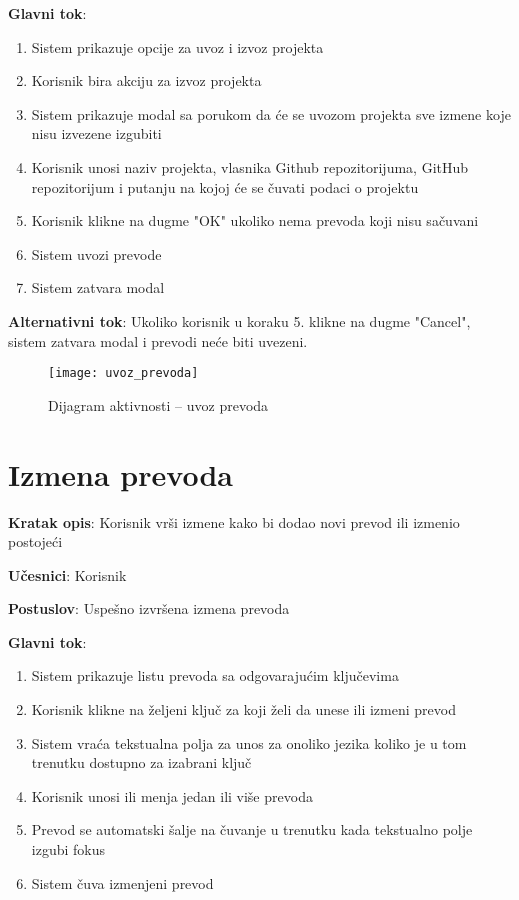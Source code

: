 \textbf{Glavni tok}:
\begin{enumerate}
    \item Sistem prikazuje opcije za uvoz i izvoz projekta
    \item Korisnik bira akciju za izvoz projekta
    \item Sistem prikazuje modal sa porukom da će se uvozom projekta sve 
    izmene koje nisu izvezene izgubiti
    \item Korisnik unosi naziv projekta, vlasnika Github repozitorijuma, 
    GitHub repozitorijum i putanju na kojoj će se čuvati podaci o projektu
    \item Korisnik klikne na dugme "OK" ukoliko nema prevoda koji nisu sačuvani
    \item Sistem uvozi prevode
    \item Sistem zatvara modal
\end{enumerate}

\textbf{Alternativni tok}: Ukoliko korisnik u koraku 5. klikne na dugme "Cancel", 
sistem zatvara modal i prevodi neće biti uvezeni.

\begin{figure}[H]
    \centering
    \texttt{[image: uvoz\_prevoda]}
    \caption{Dijagram aktivnosti -- uvoz prevoda}
\end{figure}


\section{Izmena prevoda}

\textbf{Kratak opis}: Korisnik vrši izmene kako bi dodao novi prevod ili izmenio postojeći

\textbf{Učesnici}: Korisnik

\textbf{Postuslov}: Uspešno izvršena izmena prevoda

\textbf{Glavni tok}:
\begin{enumerate}
    \item Sistem prikazuje listu prevoda sa odgovarajućim ključevima
    \item Korisnik klikne na željeni ključ za koji želi da unese ili izmeni prevod
    \item Sistem vraća tekstualna polja za unos za onoliko jezika koliko je u tom 
    trenutku dostupno za izabrani ključ
    \item Korisnik unosi ili menja jedan ili više prevoda
    \item Prevod se automatski šalje na čuvanje u trenutku kada tekstualno polje izgubi fokus
    \item Sistem čuva izmenjeni prevod
\end{enumerate}


